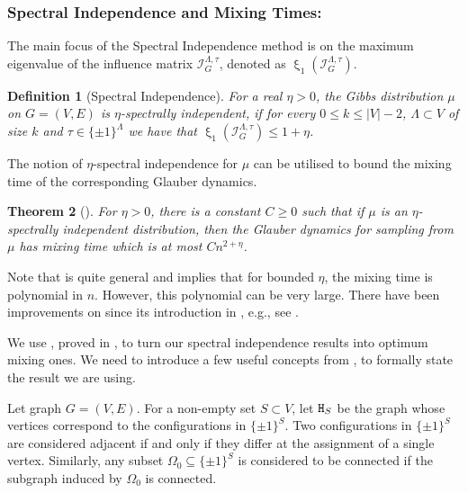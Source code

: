 \documentclass[11pt,reqno]{amsart}
\numberwithin{equation}{section}
\newtheorem{theorem}{Theorem}[section]
\newtheorem{definition}[theorem]{Definition}
\newcommand{\cI}{{\mathcal{I}}}
\newcommand{\bluepigment}[1]{{\color{blue(pigment)}#1}}
\newcommand{\infmatrix}{\cI}
\newcommand{\eigenval}{\upxi}
\renewcommand{\bluepigment}[1]{#1}
\newcommand{\kk}{\bluepigment{k}}
\renewcommand{\kk}{k}
\begin{document}
\subsubsection*{Spectral Independence and Mixing Times:}
The main focus of the Spectral Independence method is on  the maximum eigenvalue of the influence
matrix $\infmatrix^{\Lambda,\tau}_{G}$, denoted as $\eigenval_{1} (\infmatrix^{\Lambda,\tau}_{G})$.
 

\begin{definition}[Spectral Independence]\label{Def:SpInMu}
For a real $\eta>0$, the Gibbs distribution $\mu$ on $G=(V,E)$ is $\eta$-spectrally
independent, if for every $0\leq \kk\leq |V|-2$, $\Lambda\subset V$ of size $\kk$ and $\tau\in \{\pm 1\}^\Lambda$
we have that $\eigenval_{1}(\cI^{\Lambda,\tau}_{G})\leq 1+\eta$. 
\end{definition}



\noindent
The notion of $\eta$-spectral independence for $\mu$ can be utilised to bound the mixing time of the corresponding 
Glauber dynamics. 


\begin{theorem}[\cite{OptMCMCIS}]\label{thrm:SPCT-INDClosed}
For $\eta>0$, there is a constant $C\geq 0$ such that if $\mu$ is an $\eta$-spectrally independent distribution, 
then the Glauber dynamics for sampling from $\mu$ has {\em mixing time} which is at most $Cn^{2+\eta}$. 
\end{theorem} 

 

Note that  is quite general and implies that for bounded $\eta$, the mixing time is 
polynomial in $n$. However, this polynomial can be very large. There have been improvements on 
 since its introduction in \cite{OptMCMCIS}, e.g., see 
\cite{VigodaSpectralIndB,FastMCMCLocalisation,WeimingCoUbboundedDelta}. 



We use , proved in \cite{VigodaSpectralIndB}, to turn our spectral independence results into 
optimum mixing ones. 
%
We need to introduce a few useful concepts from \cite{VigodaSpectralIndB}, to formally state the result we are using.

Let graph $G=(V,E)$. For a non-empty set  $S\subset V$, let  ${\tt H}_S$ be the graph whose vertices correspond to 
 the configurations in $\{\pm 1\}^S$.  Two configurations in $\{\pm 1\}^S$ are considered adjacent 
 if and only if they differ at the assignment  of a single vertex.
% 
 Similarly, any subset $\Omega_0\subseteq \{\pm 1\}^S$ is considered to be connected if the subgraph
 induced by $\Omega_0$ is connected. 
 
\end{document}
